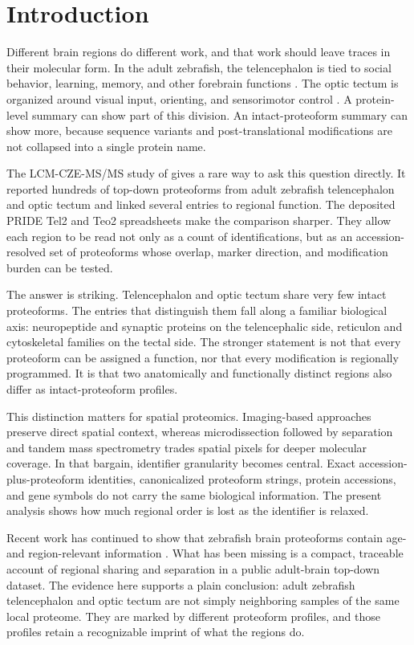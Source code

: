 \section{Introduction}

Different brain regions do different work, and that work should leave traces in their molecular form. In the adult zebrafish, the telencephalon is tied to social behavior, learning, memory, and other forebrain functions \citep{stednitz2018social,reemst2023memory,pandey2023telencephalon}. The optic tectum is organized around visual input, orienting, and sensorimotor control \citep{roeser2003tectum,orger2016visuomotor}. A protein-level summary can show part of this division. An intact-proteoform summary can show more, because sequence variants and post-translational modifications are not collapsed into a single protein name.

The LCM-CZE-MS/MS study of \citet{lubeckyj2022lcmcze} gives a rare way to ask this question directly. It reported hundreds of top-down proteoforms from adult zebrafish telencephalon and optic tectum and linked several entries to regional function. The deposited PRIDE Tel2 and Teo2 spreadsheets make the comparison sharper. They allow each region to be read not only as a count of identifications, but as an accession-resolved set of proteoforms whose overlap, marker direction, and modification burden can be tested.

The answer is striking. Telencephalon and optic tectum share very few intact proteoforms. The entries that distinguish them fall along a familiar biological axis: neuropeptide and synaptic proteins on the telencephalic side, reticulon and cytoskeletal families on the tectal side. The stronger statement is not that every proteoform can be assigned a function, nor that every modification is regionally programmed. It is that two anatomically and functionally distinct regions also differ as intact-proteoform profiles.

This distinction matters for spatial proteomics. Imaging-based approaches preserve direct spatial context, whereas microdissection followed by separation and tandem mass spectrometry trades spatial pixels for deeper molecular coverage. In that bargain, identifier granularity becomes central. Exact accession-plus-proteoform identities, canonicalized proteoform strings, protein accessions, and gene symbols do not carry the same biological information. The present analysis shows how much regional order is lost as the identifier is relaxed.

Recent work has continued to show that zebrafish brain proteoforms contain age- and region-relevant information \citep{askarani2025aging}. What has been missing is a compact, traceable account of regional sharing and separation in a public adult-brain top-down dataset. The evidence here supports a plain conclusion: adult zebrafish telencephalon and optic tectum are not simply neighboring samples of the same local proteome. They are marked by different proteoform profiles, and those profiles retain a recognizable imprint of what the regions do.
